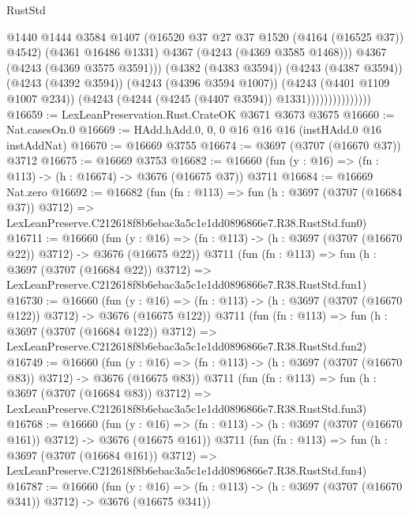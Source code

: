 \begin{lexlean}{RustStd}
\begin{coremodule}
                                  @1440
                                  @1444
                                  @3584
                                  @1407
                                  (@16520 @37 @27 @37 @1520 (@4164 (@16525 @37)) @4542)
                                  (@4361 @16486 @1331)
                                  @4367
                                  (@4243 (@4369 @3585 @1468)))
                                @4367
                                (@4243 (@4369 @3575 @3591)))
                              (@4382 (@4383 @3594))
                              (@4243 (@4387 @3594))
                              (@4243 (@4392 @3594))
                              (@4243 (@4396 @3594 @1007))
                              (@4243 (@4401 @1109 @1007 @234))
                              (@4243 (@4244 (@4245 (@4407 @3594)) @1331)))))))))))))))
@16659 := LexLeanPreservation.Rust.CrateOK @3671 @3673 @3675
@16660 := Nat.casesOn.{0}
@16669 := HAdd.hAdd.{0, 0, 0} @16 @16 @16 (instHAdd.{0} @16 instAddNat)
@16670 := @16669 @3755
@16674 := @3697 (@3707 (@16670 @37)) @3712
@16675 := @16669 @3753
@16682 := @16660 (fun (y : @16) => (fn : @113) -> (h : @16674) -> @3676 (@16675 @37)) @3711
@16684 := @16669 Nat.zero
@16692 := @16682
    (fun (fn : @113) =>
    fun (h : @3697 (@3707 (@16684 @37)) @3712) =>
    LexLeanPreserve.C212618f8b6ebac3a5c1e1dd0896866e7.R38.RustStd.fun0)
@16711 := @16660
    (fun (y : @16) => (fn : @113) -> (h : @3697 (@3707 (@16670 @22)) @3712) -> @3676 (@16675 @22))
    @3711
    (fun (fn : @113) =>
    fun (h : @3697 (@3707 (@16684 @22)) @3712) =>
    LexLeanPreserve.C212618f8b6ebac3a5c1e1dd0896866e7.R38.RustStd.fun1)
@16730 := @16660
    (fun (y : @16) => (fn : @113) -> (h : @3697 (@3707 (@16670 @122)) @3712) -> @3676 (@16675 @122))
    @3711
    (fun (fn : @113) =>
    fun (h : @3697 (@3707 (@16684 @122)) @3712) =>
    LexLeanPreserve.C212618f8b6ebac3a5c1e1dd0896866e7.R38.RustStd.fun2)
@16749 := @16660
    (fun (y : @16) => (fn : @113) -> (h : @3697 (@3707 (@16670 @83)) @3712) -> @3676 (@16675 @83))
    @3711
    (fun (fn : @113) =>
    fun (h : @3697 (@3707 (@16684 @83)) @3712) =>
    LexLeanPreserve.C212618f8b6ebac3a5c1e1dd0896866e7.R38.RustStd.fun3)
@16768 := @16660
    (fun (y : @16) => (fn : @113) -> (h : @3697 (@3707 (@16670 @161)) @3712) -> @3676 (@16675 @161))
    @3711
    (fun (fn : @113) =>
    fun (h : @3697 (@3707 (@16684 @161)) @3712) =>
    LexLeanPreserve.C212618f8b6ebac3a5c1e1dd0896866e7.R38.RustStd.fun4)
@16787 := @16660
    (fun (y : @16) => (fn : @113) -> (h : @3697 (@3707 (@16670 @341)) @3712) -> @3676 (@16675 @341))

\end{coremodule}
\end{lexlean}
